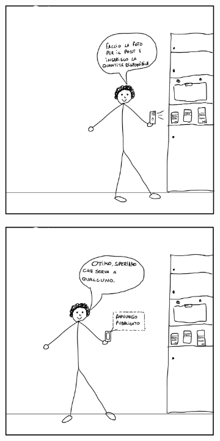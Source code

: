 \documentclass{article}
\begin{document}
\begin{figure}[H]
\begin{subfigure}{0.25\textwidth}
    \end{subfigure}
    \hspace{0.02\textwidth}
    \begin{subfigure}{0.25\textwidth}
        \centering
        \includegraphics[width=\textwidth]{Storyboard/task2-img/t2.3.png}
    \end{subfigure}
    \hspace{0.02\textwidth}
    \begin{subfigure}{0.25\textwidth}
        \leftskip -4.33cm
        \includegraphics[width=\textwidth]{Storyboard/task2-img/t2.4.png}
    \end{subfigure}
\end{figure}
\end{document}
